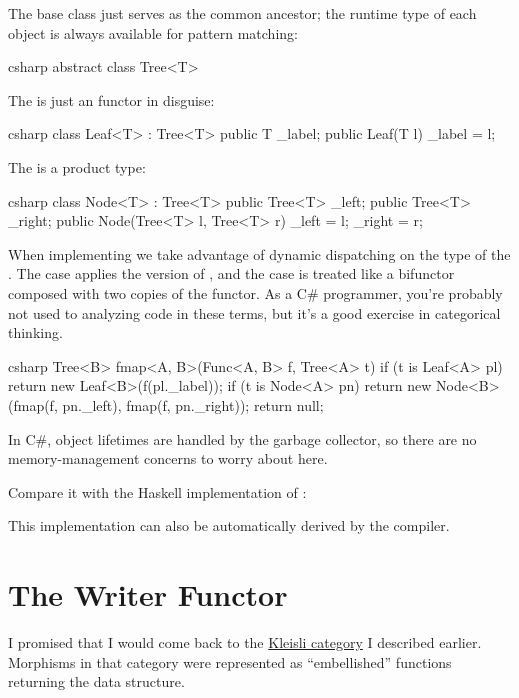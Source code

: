 The base class just serves as the common ancestor; the runtime type of
each object is always available for pattern matching:

\begin{snip}{csharp}
abstract class Tree<T> { }
\end{snip}
The  is just an  functor in disguise:

\begin{snip}{csharp}
class Leaf<T> : Tree<T> {
    public T _label;
    public Leaf(T l) { _label = l; }
}
\end{snip}
The  is a product type:

\begin{snip}{csharp}
class Node<T> : Tree<T> {
    public Tree<T> _left;
    public Tree<T> _right;
    public Node(Tree<T> l, Tree<T> r) { _left = l; _right = r; }
}
\end{snip}
When implementing  we take advantage of dynamic dispatching
on the type of the . The  case applies the
 version of , and the  case
is treated like a bifunctor composed with two copies of the
 functor. As a C\# programmer, you're probably not used to
analyzing code in these terms, but it's a good exercise in categorical
thinking.

\begin{snip}{csharp}
Tree<B> fmap<A, B>(Func<A, B> f, Tree<A> t) {
    if (t is Leaf<A> pl)
        return new Leaf<B>(f(pl._label));
    if (t is Node<A> pn)
        return new Node<B>(fmap(f, pn._left),
                           fmap(f, pn._right));
    return null;
}
\end{snip}
In C\#, object lifetimes are handled by the garbage collector, so there
are no memory-management concerns to worry about here.

Compare it with the Haskell implementation of :

This implementation can also be automatically derived by the compiler.

\section{The Writer Functor}

I promised that I would come back to the \hyperref[kleisli-categories]{Kleisli
  category} I described earlier. Morphisms in that category were
represented as ``embellished'' functions returning the 
data structure.

